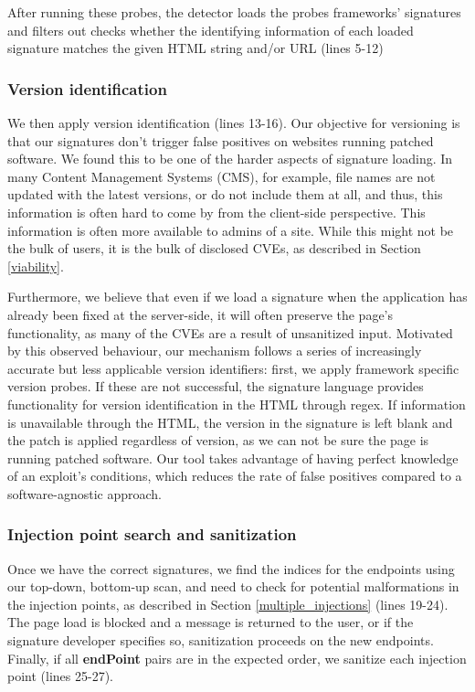 After running these probes, the detector loads the probes frameworks' signatures and filters out checks whether the identifying information of each loaded signature matches the given HTML string and/or URL (lines 5-12)

\subsubsection{Version identification} \label{versioning}
We then apply version identification (lines 13-16). Our objective for versioning is that our signatures don't trigger false positives on websites running patched software. We found this to be one of the harder aspects of signature loading. In many Content Management Systems (CMS), for example, file names are not updated with the latest versions, or do not include them at all, and thus, this information is often hard to come by from the client-side perspective. This information is often more available to admins of a site. While this might not be the bulk of users, it is the bulk of disclosed CVEs, as described in Section \ref{viability}.

Furthermore, we believe that even if we load a signature when the application has already been fixed at the server-side, it will often preserve the page's functionality, as many of the CVEs are a result of unsanitized input. Motivated by this observed behaviour, our mechanism follows a series of increasingly accurate but less applicable version identifiers: first, we apply framework specific version probes. If these are not successful, the signature language provides functionality for version identification in the HTML through regex. If information is unavailable through the HTML, the version in the signature is left blank and the patch is applied regardless of version, as we can not be sure the page is running patched software. Our tool takes advantage of having perfect knowledge of an exploit's conditions, which reduces the rate of false positives compared to a software-agnostic approach.

\subsubsection{Injection point search and sanitization} \label{search_and_sanitization}
Once we have the correct signatures, we find the indices for the endpoints using our top-down, bottom-up scan, and need to check for potential malformations in the injection points, as described in Section \ref{multiple_injections} (lines 19-24). The page load is blocked and a message is returned to the user, or if the signature developer specifies so, sanitization proceeds on the new endpoints. Finally, if all \textbf{endPoint} pairs are in the expected order, we sanitize each injection point (lines 25-27).


